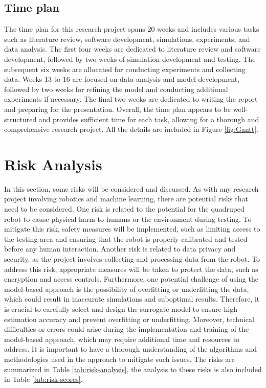 \subsection*{Time plan}
The time plan for this research project spans 20 weeks and includes various tasks such as literature review, software development, simulations, experiments, and data analysis. The first four weeks are dedicated to literature review and software development, followed by two weeks of simulation development and testing. The subsequent six weeks are allocated for conducting experiments and collecting data. Weeks 13 to 16 are focused on data analysis and model development, followed by two weeks for refining the model and conducting additional experiments if necessary. The final two weeks are dedicated to writing the report and preparing for the presentation. Overall, the time plan appears to be well-structured and provides sufficient time for each task, allowing for a thorough and comprehensive research project. All the details are included in Figure \ref{fig:Gantt}.


\section{Risk Analysis}
In this section, some risks will be considered and discussed. As with any research project involving robotics and machine learning, there are potential risks that need to be considered. One risk is related to the potential for the quadruped robot to cause physical harm to humans or the environment during testing. To mitigate this risk, safety measures will be implemented, such as limiting access to the testing area and ensuring that the robot is properly calibrated and tested before any human interaction. Another risk is related to data privacy and security, as the project involves collecting and processing data from the robot. To address this risk, appropriate measures will be taken to protect the data, such as encryption and access controls. Furthermore, one potential challenge of using the model-based  approach is the possibility of overfitting or underfitting the data, which could result in inaccurate simulations and suboptimal results. Therefore, it is crucial to carefully select and design the surrogate model to ensure high estimation accuracy and prevent overfitting or underfitting. Moreover, technical difficulties or errors could arise during the implementation and training of the model-based  approach, which may require additional time and resources to address. It is important to have a thorough understanding of the algorithms and methodologies used in the approach to mitigate such issues. The risks are summarized in Table \ref{tab:risk-analysis}, the analysis to these risks is also included in Table \ref{tab:risk-scores}.


